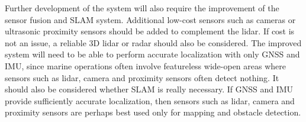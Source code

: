 Further development of the system will also require the improvement of the sensor fusion and SLAM system. Additional low-cost sensors such as cameras or ultrasonic proximity sensors should be added to complement the lidar. If cost is not an issue, a reliable 3D lidar or radar should also be considered. The improved system will need to be able to perform accurate localization with only GNSS and IMU, since marine operations often involve featureless wide-open areas where sensors such as lidar, camera and proximity sensors often detect nothing. It should also be considered whether SLAM is really necessary. If GNSS and IMU provide sufficiently accurate localization, then sensors such as lidar, camera and proximity sensors are perhaps best used only for mapping and obstacle detection.




